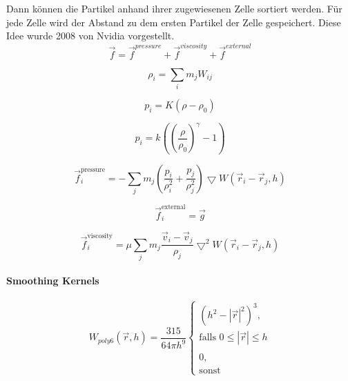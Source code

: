 \documentclass[a4paper]{paper}
\begin{document}
Dann können die Partikel anhand ihrer zugewiesenen Zelle sortiert werden. Für jede Zelle wird der Abstand zu dem ersten Partikel der Zelle gespeichert. Diese Idee wurde 2008 von Nvidia vorgestellt. \citep{Nvidia}
\begin{equation}
\label{force}
\vec{f} = \vec{f}^{pressure} + \vec{f}^{viscosity} + \vec{f}^{external}
\end{equation}


\begin{equation}
\label{density}
\rho_i = \sum_i{m_j W_{ij}}
\end{equation}



\begin{equation}
\label{pressure}
p_i=K(\rho-\rho_0)
\end{equation}

\begin{equation}
\label{pressure_tait}
p_i = k((\frac{\rho}{\rho_{0}})^{\gamma}-1)
\end{equation}

\begin{equation}
\label{force_pressure}
\vec{f}^{\text{pressure}}_{i} = - \sum_{j}m_{j}(\frac{p_{i}}{\rho_{i}^2} +\frac{p_{j}}{\rho_{j}^2})\bigtriangledown W(\vec{r}_{i}-\vec{r}_{j},h)
\end{equation}

\begin{equation}
\label{force_external}
\vec{f}^{\text{external}}_{i} = \vec{g}
\end{equation}

\begin{equation}
\label{force_viscosity}
\vec{f}^{\text{viscosity}}_{i} = \mu \sum_{j}m_{j}\frac{\vec{v}_{i} - \vec{v}_{j}}{\rho_{j}}\bigtriangledown^2 W(\vec{r}_{i}-\vec{r}_{j},h)
\end{equation}

\paragraph{Smoothing Kernels}

\begin{equation}
\label{poly6}
W_{poly6}(\vec{r},h) = \frac{315}{64 \pi h^9} 
\begin{cases}
(h^2-|\vec{r}|^2)^3, \\ \text{falls } 0 \leq |\vec{r}| \leq h \\
\\
0, \\ \text{sonst}
\end{cases}
\end{equation}
\end{document}
